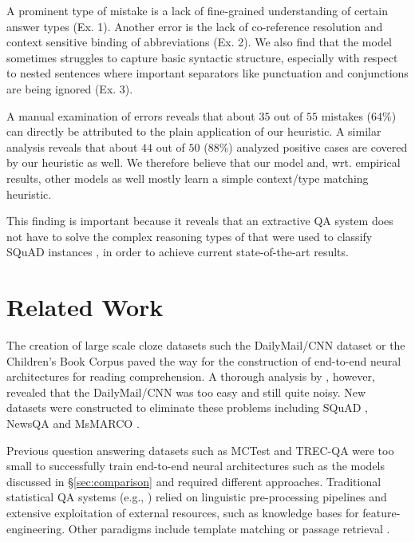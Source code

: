 \documentclass[11pt,a4paper]{article}
\begin{document}
A prominent type of mistake is a lack of fine-grained understanding of certain answer types (Ex. 1). Another error is the lack of co-reference resolution and context sensitive binding of abbreviations (Ex. 2). We also find that the model sometimes struggles to capture basic syntactic structure, especially with respect to nested sentences where important separators like punctuation and conjunctions are being ignored (Ex. 3).

A manual examination of errors reveals that about $35$ out of $55$ mistakes ($64\%$) can directly be attributed to the plain application of our heuristic. A similar analysis reveals that about $44$ out of $50$ ($88\%$) analyzed positive cases are covered by our heuristic as well. We therefore believe that our model and, wrt. empirical results, other models as well mostly learn a simple context/type matching heuristic. 

This finding is important because it reveals that an extractive QA system does not have to solve the complex reasoning types of  that were used to classify SQuAD instances \cite{Rajpurkar2016}, in order to achieve current state-of-the-art results.

\section{Related Work}

The creation of large scale cloze datasets such the DailyMail/CNN dataset \cite{Hermann2015} or the Children's Book Corpus \cite{Hill2016} paved the way for the construction of end-to-end neural architectures for reading comprehension. A thorough analysis by , however, revealed that the DailyMail/CNN was too easy and still quite noisy. New datasets were constructed to eliminate these problems including SQuAD \cite{Rajpurkar2016}, NewsQA \cite{Trischler2017} and MsMARCO \cite{Nguyen2016}.

Previous question answering datasets such as MCTest \cite{Richardson2013} and TREC-QA \cite{Dang2007} were too small to successfully train end-to-end neural architectures such as the models discussed in \S\ref{sec:comparison} and required different approaches. Traditional statistical QA systems (e.g., ) relied on linguistic pre-processing pipelines and extensive exploitation of external resources, such as knowledge bases for feature-engineering. Other paradigms include template matching or passage retrieval \cite{Andrenucci2005}.
\end{document}
